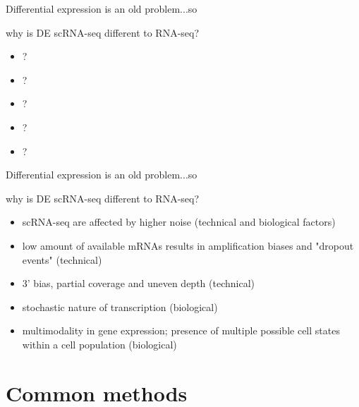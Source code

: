 \documentclass{beamer}\usepackage[]{graphicx}\usepackage[]{color}
\begin{document}
\begin{frame}
Differential expression is an old problem...so
\begin{block}{why is DE scRNA-seq different to RNA-seq?}
\begin{itemize}
  \item ?
  \item ?
  \item ?
  \item ?
  \item ?
 \end{itemize}
\end{block}
\end{frame}

\begin{frame}
Differential expression is an old problem...so
\begin{block}{why is DE scRNA-seq different to RNA-seq?}
\begin{itemize}
  \item scRNA-seq are affected by higher noise (technical and biological factors)
  \item low amount of available mRNAs results in amplification biases and "dropout events" (technical)
  \item 3' bias, partial coverage and uneven depth (technical)
  \item stochastic nature of transcription (biological)
  \item multimodality in gene expression; presence of multiple possible cell states within a cell population (biological)
 \end{itemize}
\end{block}
\end{frame}



\section{Common methods}

\begin{frame}
\begin{center}
\insertsection
\end{center}
\end{frame}
\end{document}
